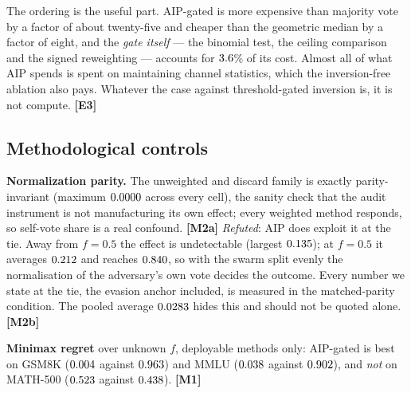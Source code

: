 The ordering is the useful part. AIP-gated is more expensive than majority vote
by a factor of about twenty-five and cheaper than the geometric median by a
factor of eight, and the \emph{gate itself} --- the binomial test, the ceiling
comparison and the signed reweighting --- accounts for
$3.6$\% of its cost. Almost all of what AIP spends is spent
on maintaining channel statistics, which the inversion-free ablation also pays.
Whatever the case against threshold-gated inversion is, it is not compute.
\textbf{[E3]}

\subsection{Methodological controls}

\textbf{Normalization parity.} The unweighted and discard family is exactly
parity-invariant (maximum $0.0000$ across every cell), the
sanity check that the audit instrument is not manufacturing its own effect; every
weighted method responds, so self-vote share is a real confound. \textbf{[M2a]}
\emph{Refuted}: AIP does exploit it at the tie. Away from $f=0.5$ the effect is
undetectable (largest $0.135$); at $f=0.5$ it averages
$0.212$ and reaches $0.840$, so with the swarm split
evenly the normalisation of the adversary's own vote decides the outcome. Every
number we state at the tie, the evasion anchor included, is measured in the
matched-parity condition. The pooled average $0.0283$ hides this and
should not be quoted alone. \textbf{[M2b]}

\textbf{Minimax regret} over unknown $f$, deployable methods only: AIP-gated is
best on GSM8K ($0.004$ against $0.963$) and MMLU
($0.038$ against $0.902$), and \emph{not} on MATH-500
($0.523$ against $0.438$). \textbf{[M1]}

